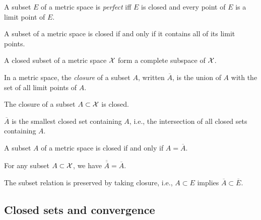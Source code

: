 \begin{defn}
  \label{def:perfectSets}
  A subset $E$ of a metric space is \emph{perfect}
  iff $E$ is closed and every point of $E$
  is a limit point of $E$.
\end{defn}


\begin{lem}
  \label{lem:closedSetsContainsAllLimitPoints}
  A subset of a metric space is closed
  if and only if it contains all of its limit points.
\end{lem}

\begin{coro}
  \label{coro:closedSubsetIsComplete}
  A closed subset of a metric space ${\cal X}$
  form a complete subspace of ${\cal X}$.
\end{coro}

\begin{defn}
  \label{def:closureInMetricSpace}
  In a metric space, 
  the \emph{closure} of a subset $A$,
  written $\overline{A}$,
  is the union of $A$ with the set of all limit points of $A$. 
\end{defn}

\begin{lem}
  \label{lem:closureIsClosed}
  The closure of a subset $A\subset{\cal X}$ is closed.
\end{lem}

\begin{coro}
  \label{coro:closureBeingSmallest}
  $\overline{A}$ is the smallest closed set containing $A$, 
  i.e., the intersection of all closed sets containing $A$.
\end{coro}

\begin{coro}
  \label{coro:closedFromClosure}
  A subset $A$ of a metric space is closed
  if and only if $A=\overline{A}$.
\end{coro}

\begin{coro}
  \label{coro:closureIdempotence}
  For any subset $A\subset {\cal X}$,
  we have $\overline{\overline{A}}=\overline{A}$. 
\end{coro}

\begin{coro}
  \label{coro:closurePreserveSubset}
  The subset relation is preserved by taking closure, 
  i.e., $A\subset E$ implies $\overline{A}\subset \overline{E}$.
\end{coro}


\subsection{Closed sets and convergence}
\label{sec:clos-sets-conv}


